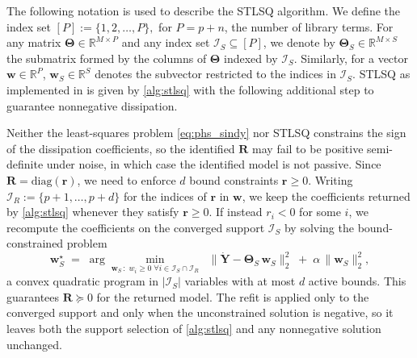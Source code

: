 \documentclass[11pt, a4paper]{article}
\theoremstyle{plain}
\theoremstyle{definition}
\theoremstyle{remark}
\begin{document}
The following notation is used to describe the STLSQ algorithm. We define the index set 
    \(
    [P] := \{1,2,\dots,P\},
    \)
    for $P=p+n$, the number of library terms. For any matrix \( \boldsymbol{\Theta} \in \mathbb{R}^{M\times P} \) and any index set \( \mathcal I_S  \subseteq [P] \), we denote by \( \boldsymbol{\Theta}_S \in \mathbb{R}^{M\times S}\) the submatrix formed by the columns of \( \boldsymbol{\Theta} \) indexed by \( \mathcal I_S \). Similarly, for a vector \( \mathbf{w} \in \mathbb{R}^{P} \), \( \mathbf{w}_S \in \mathbb R^S \) denotes the subvector restricted to the indices in \( \mathcal I_S \). STLSQ as implemented in \cite{de2020pysindy} is given by \cref{alg:stlsq} with the following additional step to guarantee nonnegative dissipation.

Neither the least-squares problem \eqref{eq:phs_sindy} nor STLSQ constrains the sign of the dissipation coefficients, so the identified $\mathbf{R}$ may fail to be positive semi-definite under noise, in which case the identified model is not passive. Since $\mathbf{R}=\mathrm{diag}(\mathbf{r})$, we need to enforce $d$ bound constraints $\mathbf{r}\ge 0$. Writing $\mathcal I_R := \{p+1,\dots,p+d\}$ for the indices of $\mathbf{r}$ in $\mathbf{w}$, we keep the coefficients returned by \cref{alg:stlsq} whenever they satisfy $\mathbf{r}\ge 0$. If instead $r_i<0$ for some $i$, we recompute the coefficients on the converged support $\mathcal I_S$ by solving the bound-constrained problem
\begin{equation}
\mathbf{w}_S^{\star} \;=\;
\arg\min_{\mathbf{w}_S \,:\; w_i \ge 0 \;\forall i \in \mathcal I_S \cap \mathcal I_R}
\;\; \bigl\| \dot{\mathbf{Y}} - \boldsymbol{\Theta}_S\,\mathbf{w}_S \bigr\|_2^2
\;+\; \alpha\,\|\mathbf{w}_S\|_2^2 ,
\label{eq:refit}
\end{equation}
a convex quadratic program in $|\mathcal I_S|$ variables with at most $d$ active bounds. This guarantees $\mathbf{R}\succeq 0$ for the returned model. The refit is applied only to the converged support and only when the unconstrained solution is negative, so it leaves both the support selection of \cref{alg:stlsq} and any nonnegative solution unchanged.
\end{document}
